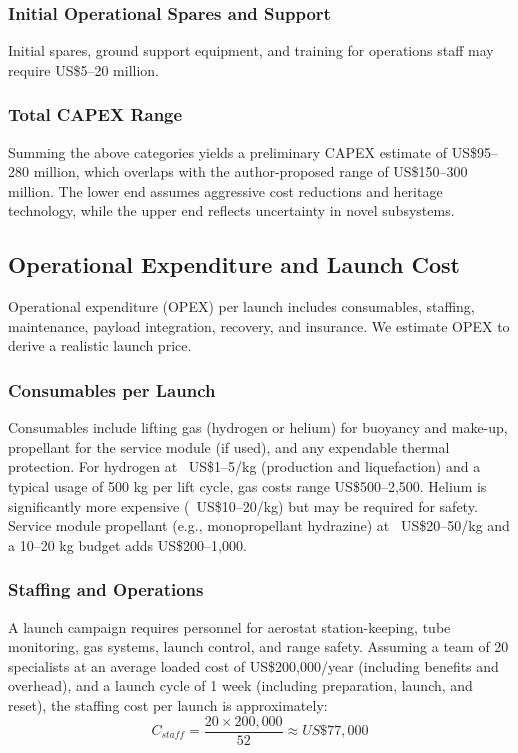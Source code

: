 \subsubsection{Initial Operational Spares and Support}
Initial spares, ground support equipment, and training for operations staff may require US\$5–20 million.

\subsubsection{Total CAPEX Range}
Summing the above categories yields a preliminary CAPEX estimate of US\$95–280 million, which overlaps with the author-proposed range of US\$150–300 million. The lower end assumes aggressive cost reductions and heritage technology, while the upper end reflects uncertainty in novel subsystems.

\subsection{Operational Expenditure and Launch Cost}
Operational expenditure (OPEX) per launch includes consumables, staffing, maintenance, payload integration, recovery, and insurance. We estimate OPEX to derive a realistic launch price.

\subsubsection{Consumables per Launch}
Consumables include lifting gas (hydrogen or helium) for buoyancy and make-up, propellant for the service module (if used), and any expendable thermal protection. For hydrogen at ~US\$1–5/kg (production and liquefaction) and a typical usage of 500 kg per lift cycle, gas costs range US\$500–2,500. Helium is significantly more expensive (~US\$10–20/kg) but may be required for safety. Service module propellant (e.g., monopropellant hydrazine) at ~US\$20–50/kg and a 10–20 kg budget adds US\$200–1,000.

\subsubsection{Staffing and Operations}
A launch campaign requires personnel for aerostat station-keeping, tube monitoring, gas systems, launch control, and range safety. Assuming a team of 20 specialists at an average loaded cost of US\$200,000/year (including benefits and overhead), and a launch cycle of 1 week (including preparation, launch, and reset), the staffing cost per launch is approximately:
\begin{equation}
C_{staff} = \frac{20 \times 200{,}000}{52} \approx US\$77{,}000
\end{equation}

